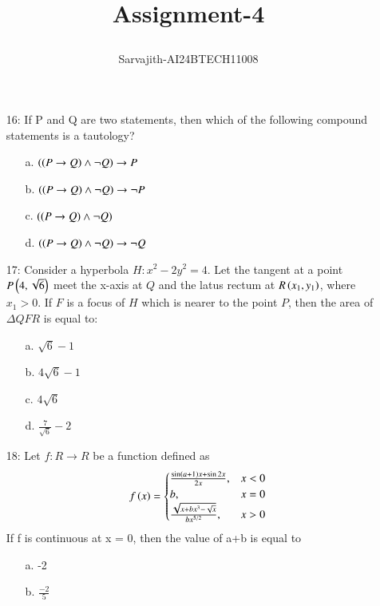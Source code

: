 \documentclass[journal,12pt,twocolumn]{IEEEtran}
\title{Assignment-4

}
\author{Sarvajith-AI24BTECH11008}
\theoremstyle{remark}
\begin{document}
\maketitle

\begin{enumerate}
	\item[16:] If P and Q are two statements, then which of the following compound statements is a tautology?

\begin{enumerate}
    \item [a.] $\left(\left(P\rightarrow Q\right)\land \neg Q\right)\rightarrow P$
    \item [b.] $\left(\left(P\rightarrow Q\right)\land \neg Q\right)\rightarrow \neg P$
    \item [c.] $\left(\left(P\rightarrow Q\right)\land \neg Q\right)$
    \item [d.] $\left(\left(P\rightarrow Q\right)\land \neg Q\right)\rightarrow \neg Q$
\end{enumerate}
\item[17:]  Consider a hyperbola $H : x^2 - 2y^2 = 4$. Let the tangent at a point $P \left(4, \sqrt{6}\right)$ meet the x-axis at $Q$ and the latus rectum at $ R \left(x_1, y_1\right)$, where  $x_1 > 0$. If $ F $ is a focus of $H$  which is nearer to the point  $P$, then the area of $\Delta QFR$ is equal to:
\begin{multicols}{2}
\begin{enumerate}
    \item [a.] $\sqrt{6}-1$
    \item [b.] $4\sqrt{6}-1$
	    \columnbreak
    \item [c.] $4\sqrt{6}$
    \item [d.] $\frac{7}{\sqrt{6}}-2$
\end{enumerate}
\end{multicols}
\item[18:] Let $f:R\rightarrow R$ be a function defined as 
$$f\left(x\right) = \begin{cases}
    \frac{\sin\left(a+1\right)x + \sin 2x}{2x}, & x<0\\
    b, & x=0\\
    \frac{\sqrt{x+bx^3-\sqrt{x}}}{bx^{5/2}}, & x>0
\end{cases}$$
If f is continuous at x = 0, then the value of a+b is equal to
\begin{multicols}{2}
\begin{enumerate}
    \item [a.] -2
    \item [b.] $\frac{-2}{5}$

\end{enumerate}
\end{multicols}
\end{enumerate}
\end{document}
